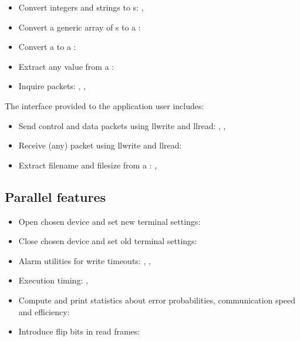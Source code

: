 \documentclass[main.tex]{subfiles}
\begin{document}
\begin{itemize}[noitemsep,rightmargin=3em]
\item Convert integers and strings to s:
, 

\item Convert a generic array of s to a :

\item Convert a  to a :

\item Extract any  value from a :

\item Inquire packets:
, , 
\end{itemize}

The interface provided to the application user includes:

\begin{itemize}[noitemsep,rightmargin=3em]
\item Send control and data packets using llwrite and llread:
, , 

\item Receive (any) packet using llwrite and llread:

\item Extract filename and filesize from a :
, 
\end{itemize}

\subsection{Parallel features}
\label{subsec:parallelarch}

\begin{itemize}[noitemsep,rightmargin=3em]
\item Open chosen device and set new terminal settings:

\item Close chosen device and set old terminal settings:

\item Alarm utilities for write timeouts:
, , 

\item Execution timing:
, 

\item Compute and print statistics about error probabilities, communication speed and efficiency:

\item Introduce flip bits in read frames: 
\end{itemize}
\end{document}
